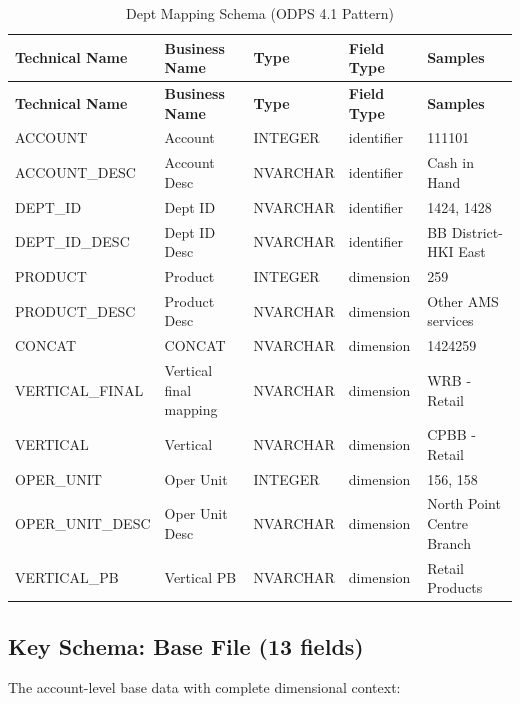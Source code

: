 \documentclass[11pt,a4paper]{article}
\begin{document}
\begin{longtable}{lllll}
\caption{Dept Mapping Schema (ODPS 4.1 Pattern)} \\
\toprule
\textbf{Technical Name} & \textbf{Business Name} & \textbf{Type} & \textbf{Field Type} & \textbf{Samples} \\
\midrule
\endfirsthead
\toprule
\textbf{Technical Name} & \textbf{Business Name} & \textbf{Type} & \textbf{Field Type} & \textbf{Samples} \\
\midrule
\endhead
ACCOUNT & Account & INTEGER & identifier & 111101 \\
ACCOUNT\_DESC & Account Desc & NVARCHAR & identifier & Cash in Hand \\
DEPT\_ID & Dept ID & NVARCHAR & identifier & 1424, 1428 \\
DEPT\_ID\_DESC & Dept ID Desc & NVARCHAR & identifier & BB District-HKI East \\
PRODUCT & Product & INTEGER & dimension & 259 \\
PRODUCT\_DESC & Product Desc & NVARCHAR & dimension & Other AMS services \\
CONCAT & CONCAT & NVARCHAR & dimension & 1424259 \\
VERTICAL\_FINAL & Vertical final mapping & NVARCHAR & dimension & WRB - Retail \\
VERTICAL & Vertical & NVARCHAR & dimension & CPBB - Retail \\
OPER\_UNIT & Oper Unit & INTEGER & dimension & 156, 158 \\
OPER\_UNIT\_DESC & Oper Unit Desc & NVARCHAR & dimension & North Point Centre Branch \\
VERTICAL\_PB & Vertical PB & NVARCHAR & dimension & Retail Products \\
\bottomrule
\end{longtable}

\subsection{Key Schema: Base File (13 fields)}

The account-level base data with complete dimensional context:
\end{document}
